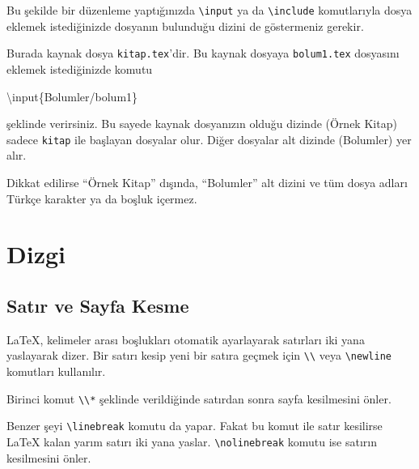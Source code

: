 \documentclass[
  letterpaper,
  DIV=11,
  numbers=noendperiod]{scrreprt}
\newenvironment{Shaded}{\begin{snugshade}}{\end{snugshade}}
\newcommand{\FunctionTok}[1]{\textcolor[rgb]{0.28,0.35,0.67}{#1}}
\newcommand{\NormalTok}[1]{\textcolor[rgb]{0.00,0.23,0.31}{#1}}
\begin{document}
Bu şekilde bir düzenleme yaptığınızda \texttt{\textbackslash{}input} ya
da \texttt{\textbackslash{}include} komutlarıyla dosya eklemek
istediğinizde dosyanın bulunduğu dizini de göstermeniz gerekir.

Burada kaynak dosya \texttt{kitap.tex}'dir. Bu kaynak dosyaya
\texttt{bolum1.tex} dosyasını eklemek istediğinizde komutu

\begin{Shaded}
\begin{Highlighting}[]
\FunctionTok{\textbackslash{}input}\NormalTok{\{Bolumler/bolum1\}}
\end{Highlighting}
\end{Shaded}

şeklinde verirsiniz. Bu sayede kaynak dosyanızın olduğu dizinde (Örnek
Kitap) sadece \texttt{kitap} ile başlayan dosyalar olur. Diğer dosyalar
alt dizinde (Bolumler) yer alır.

Dikkat edilirse ``Örnek Kitap'' dışında, ``Bolumler'' alt dizini ve tüm
dosya adları Türkçe karakter ya da boşluk içermez.


\hypertarget{dizgi}{%
\chapter{Dizgi}\label{dizgi}}

\hypertarget{satux131r-ve-sayfa-kesme}{%
\section{Satır ve Sayfa Kesme}\label{satux131r-ve-sayfa-kesme}}

{\LaTeX}, kelimeler arası boşlukları otomatik ayarlayarak satırları iki
yana yaslayarak dizer. Bir satırı kesip yeni bir satıra geçmek için
\texttt{\textbackslash{}\textbackslash{}} veya
\texttt{\textbackslash{}newline} komutları kullanılır.

Birinci komut \texttt{\textbackslash{}\textbackslash{}*} şeklinde
verildiğinde satırdan sonra sayfa kesilmesini önler.

Benzer şeyi \texttt{\textbackslash{}linebreak} komutu da yapar. Fakat bu
komut ile satır kesilirse {\LaTeX} kalan yarım satırı iki yana yaslar.
\texttt{\textbackslash{}nolinebreak} komutu ise satırın kesilmesini
önler.
\end{document}
